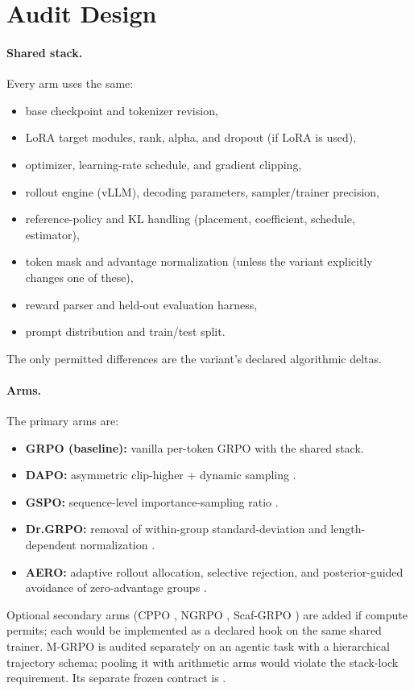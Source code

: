 \documentclass[11pt]{article}
\newcommand{\grpo}{\textsc{GRPO}}
\begin{document}
\section{Audit Design}
\label{sec:design}

\paragraph{Shared stack.} Every arm uses the same:
\begin{itemize}[leftmargin=1.4em, itemsep=2pt]
  \item base checkpoint and tokenizer revision,
  \item LoRA target modules, rank, alpha, and dropout (if LoRA is used),
  \item optimizer, learning-rate schedule, and gradient clipping,
  \item rollout engine (vLLM), decoding parameters, sampler/trainer precision,
  \item reference-policy and KL handling (placement, coefficient, schedule,
    estimator),
  \item token mask and advantage normalization (unless the variant explicitly
    changes one of these),
  \item reward parser and held-out evaluation harness,
  \item prompt distribution and train/test split.
\end{itemize}
The only permitted differences are the variant's declared algorithmic deltas.

\paragraph{Arms.} The primary arms are:
\begin{itemize}[leftmargin=1.4em, itemsep=2pt]
  \item \textbf{GRPO (baseline):} vanilla per-token GRPO with the shared stack.
  \item \textbf{DAPO:} asymmetric clip-higher + dynamic sampling
    \cite{yu2025dapo}.
  \item \textbf{GSPO:} sequence-level importance-sampling ratio
    \cite{qwen2025gspo}.
  \item \textbf{Dr.\grpo{}:} removal of within-group standard-deviation and
    length-dependent normalization
    \cite{tong2025drgrpo}.
  \item \textbf{AERO:} adaptive rollout allocation, selective rejection, and
    posterior-guided avoidance of zero-advantage groups \cite{zhang2026aero}.
\end{itemize}
Optional secondary arms (CPPO \cite{lin2025cppo}, NGRPO
\cite{nan2025ngrpo}, Scaf-\grpo{} \cite{zhang2025scaffgrpo}) are added if compute
permits; each would be implemented as a declared hook on the same shared trainer.
M-\grpo{} \cite{hong2025mgrpo} is audited separately on an agentic task with a
hierarchical trajectory schema; pooling it with arithmetic arms would violate
the stack-lock requirement. Its separate frozen contract is
.
\end{document}
